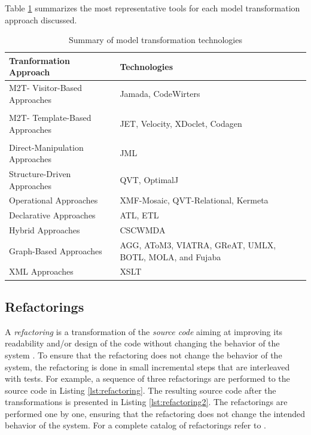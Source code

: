 Table \ref{table:toolSummary} summarizes the most representative tools for each model transformation approach discussed.

\begin{table}[h]
\centering
\caption{Summary of model transformation technologies}\label{table:toolSummary}
\begin{tabular}{l|p{6cm}}
\toprule
\rowcolor[HTML]{BBDAFF}
\textbf{Tranformation Approach} & \textbf{Technologies}     \\  \midrule
M2T- Visitor-Based Approaches & Jamada, CodeWirters  \\  \\ \hline
M2T- Template-Based Approaches  & JET, Velocity, XDoclet, Codagen  \\ \\ \hline
\hline
Direct-Manipulation Approaches & JML   \\ \hline
Structure-Driven Approaches & QVT, OptimalJ   \\ \hline
Operational Approaches & XMF-Mosaic, QVT-Relational, Kermeta  \\ \hline
Declarative Approaches & ATL, ETL    \\ \hline
Hybrid Approaches & CSCWMDA   \\ \hline
Graph-Based Approaches & AGG, AToM3, VIATRA, GReAT, UMLX, BOTL, MOLA, and Fujaba  \\ \hline
XML Approaches & XSLT   \\ 
\bottomrule
\end{tabular}
\end{table}

\subsection{Refactorings}

A \textit{refactoring} is a transformation of the \textit{source code} aiming at improving its readability and/or design of the code without changing the behavior of the system \cite{Fowler2000}. To ensure that the refactoring does not change the behavior of the system, the refactoring is done in small incremental steps that are interleaved with tests. 
For example, a sequence of three refactorings are performed to the source code in Listing \ref{lst:refactoring}.
The resulting source code after the transformations is presented in Listing  \ref{lst:refactoring2}. The refactorings are performed one by one, ensuring that the refactoring does not change the intended behavior of the system. For a complete catalog of  refactorings refer to \cite{Fowler2000}. 

